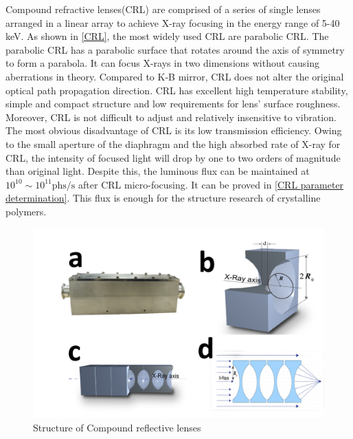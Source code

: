 \documentclass{Head}
\begin{document}
Compound refractive lenses(CRL) are comprised of a series of single lenses arranged in a linear array to achieve X-ray focusing in the energy range of 5-40 keV.
As shown in \autoref{CRL}, the most widely used CRL are parabolic CRL.
The parabolic CRL has a parabolic surface that rotates around the axis of symmetry to form a parabola.
It can focus X-rays in two dimensions without causing aberrations in theory.
Compared to K-B mirror, CRL does not alter the original optical path propagation direction. CRL has excellent high temperature stability, simple and compact structure and low requirements for lens' surface roughness. Moreover, CRL is not difficult to adjust and relatively insensitive to vibration.
The most obvious disadvantage of CRL is its low transmission efficiency.
Owing to the small aperture of the diaphragm and the high absorbed rate of X-ray for CRL, the intensity of focused light will drop by one to two orders of magnitude than original light.
Despite this, the luminous flux can be maintained at $\mathrm{10^{10}\sim 10^{11} phs/s}$ after CRL micro-focusing.
It can be proved in \autoref{CRL parameter determination}.
This flux is enough for the structure research of crystalline polymers.
\begin{figure}
    \centering
    \includegraphics[scale=0.4]{Figures/Fig2CRL.png}
    \caption{Structure of Compound reflective lenses}
    \label{CRL}
\end{figure}
\end{document}
